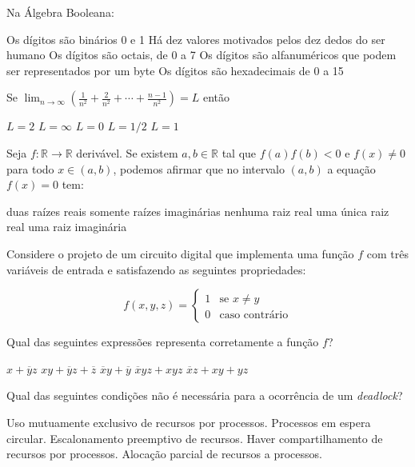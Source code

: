 \documentclass[12pt, addpoints]{exam}
\begin{document}
\begin{questions}
\question
Na Álgebra Booleana:
\begin{choices}
\choice Os dígitos são binários 0 e 1
\choice Há dez valores motivados pelos dez dedos do ser humano
\choice Os dígitos são octais, de 0 a 7
\choice Os dígitos são alfanuméricos que podem ser representados por um byte
\choice Os dígitos são hexadecimais de 0 a 15
\end{choices}

\question
Se \( \lim_{n \to \infty} \left( \frac{1}{n^2} + \frac{2}{n^2} + \cdots + \frac{n-1}{n^2} \right) = L \) então

\begin{choices}
\choice \( L = 2 \)
\choice \( L = \infty \)
\choice \( L = 0 \)
\choice \( L = 1/2 \)
\choice \( L = 1 \)
\end{choices}

\question
Seja \( f : \mathbb{R} \to \mathbb{R} \) derivável. Se existem \( a, b \in \mathbb{R} \) tal que \( f(a)f(b) < 0 \) e \( f(x) \neq 0 \) para todo \( x \in (a, b) \), podemos afirmar que no intervalo \( (a, b) \) a equação \( f(x) = 0 \) tem:
\begin{choices}
\choice duas raízes reais
\choice somente raízes imaginárias
\choice nenhuma raiz real
\choice uma única raiz real
\choice uma raiz imaginária
\end{choices}

\question
Considere o projeto de um circuito digital que implementa uma função \( f \) com três variáveis de entrada e satisfazendo as seguintes propriedades:

\[
f(x, y, z) = 
\begin{cases} 
1 & \text{se } x \neq y \\ 
0 & \text{caso contrário} 
\end{cases}
\]

Qual das seguintes expressões representa corretamente a função \( f \)?
\begin{choices}
\choice \( x + \overline{y}z \)
\choice \( xy + \overline{y}z + \overline{z} \)
\choice \( \overline{x}y + \overline{y} \)
\choice \( \overline{x}y z + x y z \)
\choice \( \overline{x}z + xy + yz \)
\end{choices}

\question
Qual das seguintes condições não é necessária para a ocorrência de um \textit{deadlock}?

\begin{choices}
\choice Uso mutuamente exclusivo de recursos por processos.
\choice Processos em espera circular.
\choice Escalonamento preemptivo de recursos.
\choice Haver compartilhamento de recursos por processos.
\choice Alocação parcial de recursos a processos.
\end{choices}


\end{questions}
\end{document}
